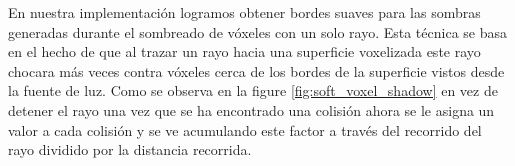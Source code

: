 En nuestra implementación logramos obtener bordes suaves para las sombras generadas durante el sombreado de vóxeles con un solo rayo. Esta técnica se basa en el hecho de que al trazar un rayo hacia una superficie voxelizada este rayo chocara más veces contra vóxeles cerca de los bordes de la superficie vistos desde la fuente de luz. Como se observa en la figure \ref{fig:soft_voxel_shadow} en vez de detener el rayo una vez que se ha encontrado una colisión ahora se le asigna un valor a cada colisión y se ve acumulando este factor a través del recorrido del rayo dividido por la distancia recorrida.


